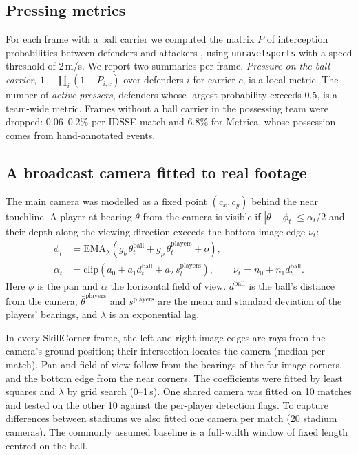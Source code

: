 \documentclass[]{interact}
\begin{document}
\subsection{Pressing metrics}
For each frame with a ball carrier we computed the matrix $P$ of interception probabilities between defenders and
attackers \citep{bekkers2025pressing}, using \texttt{unravelsports} \citep{unravelsports} with a speed threshold of
2\,m/s. We report two summaries per frame. \emph{Pressure on the ball carrier}, $1 - \prod_i (1 - P_{i,c})$ over
defenders $i$ for carrier $c$, is a local metric. The number of \emph{active pressers}, defenders whose largest
probability exceeds 0.5, is a team-wide metric. Frames without a ball carrier in the possessing team were dropped:
0.06--0.2\% per IDSSE match and 6.8\% for Metrica, whose possession comes from hand-annotated events.

\subsection{A broadcast camera fitted to real footage}
The main camera was modelled as a fixed point $(c_x, c_y)$ behind the near touchline. A player at bearing $\theta$
from the camera is visible if $|\theta - \phi_t| \le \alpha_t/2$ and their depth along the viewing direction exceeds
the bottom image edge $\nu_t$:
\begin{align}
\phi_t &= \mathrm{EMA}_{\lambda}\!\left(g_b\,\theta^{\text{ball}}_t + g_p\,\bar\theta^{\text{players}}_t + o\right),\\
\alpha_t &= \mathrm{clip}\!\left(a_0 + a_1 d^{\text{ball}}_t + a_2\, s^{\text{players}}_t\right),\qquad
\nu_t = n_0 + n_1 d^{\text{ball}}_t.
\end{align}
Here $\phi$ is the pan and $\alpha$ the horizontal field of view. $d^{\text{ball}}$ is the ball's distance from the
camera, $\bar\theta^{\text{players}}$ and $s^{\text{players}}$ are the mean and standard deviation of the players'
bearings, and $\lambda$ is an exponential lag.

In every SkillCorner frame, the left and right image edges are rays from the camera's ground position; their
intersection locates the camera (median per match). Pan and field of view follow from the bearings of the far image
corners, and the bottom edge from the near corners. The coefficients were fitted by least squares and $\lambda$ by
grid search (0--1\,s). One shared camera was fitted on 10 matches and tested on the other 10 against the per-player
detection flags. To capture differences between stadiums we also fitted one camera per match (20 stadium cameras).
The commonly assumed baseline is a full-width window of fixed length centred on the ball.
\end{document}
